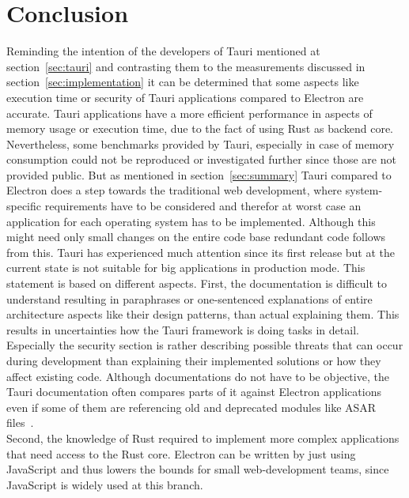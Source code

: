 \section{Conclusion}
\label{sec:conclusion}
Reminding the intention of the developers of Tauri mentioned at section~\ref{sec:tauri} and contrasting them to the measurements discussed in section~\ref{sec:implementation}
it can be determined that some aspects like execution time or security of Tauri applications compared to Electron are accurate.
Tauri applications have a more efficient performance in aspects of memory usage or execution time, due to the fact of using Rust as backend core.
Nevertheless, some benchmarks provided by Tauri, especially in case of memory consumption could not be reproduced or investigated further since those are not provided public.
But as mentioned in section~\ref{sec:summary} Tauri compared to Electron does a step towards the traditional web development, where system-specific requirements have to be considered and
therefor at worst case an application for each operating system has to be implemented.
Although this might need only small changes on the entire code base redundant code follows from this.
Tauri has experienced much attention since its first release but at the current state is not suitable for big applications in production mode.
This statement is based on different aspects.
First, the documentation is difficult to understand resulting in paraphrases or one-sentenced explanations of entire architecture aspects like their design patterns, than actual explaining them.
This results in uncertainties how the Tauri framework is doing tasks in detail.
Especially the security section is rather describing possible threats that can occur during development than explaining their implemented solutions or how they affect existing code.
Although documentations do not have to be objective, the Tauri documentation often compares parts of it against Electron applications even if some of them are referencing old and deprecated modules like ASAR files~\cite{tauri}. \\
Second, the knowledge of Rust required to implement more complex applications that need access to the Rust core.
Electron can be written by just using JavaScript and thus lowers the bounds for small web-development teams, since JavaScript is widely used at this branch.
